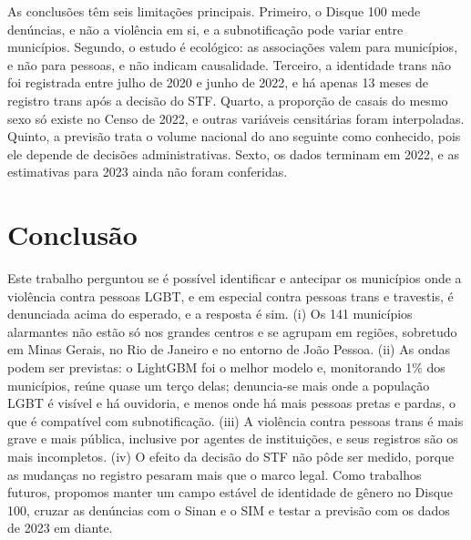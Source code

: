 \documentclass[12pt]{article}
\begin{document}
As conclusões têm seis limitações principais. Primeiro, o Disque 100 mede denúncias, e não a violência em si, e a subnotificação pode variar entre municípios. Segundo, o estudo é ecológico: as associações valem para municípios, e não para pessoas, e não indicam causalidade. Terceiro, a identidade trans não foi registrada entre julho de 2020 e junho de 2022, e há apenas 13 meses de registro trans após a decisão do STF. Quarto, a proporção de casais do mesmo sexo só existe no Censo de 2022, e outras variáveis censitárias foram interpoladas. Quinto, a previsão trata o volume nacional do ano seguinte como conhecido, pois ele depende de decisões administrativas. Sexto, os dados terminam em 2022, e as estimativas para 2023 ainda não foram conferidas.


\clearpage
\section{Conclusão}
\label{sec:conclusao}

Este trabalho perguntou se é possível identificar e antecipar os municípios onde a violência contra pessoas LGBT, e em especial contra pessoas trans e travestis, é denunciada acima do esperado, e a resposta é sim. (i) Os 141 municípios alarmantes não estão só nos grandes centros e se agrupam em regiões, sobretudo em Minas Gerais, no Rio de Janeiro e no entorno de João Pessoa. (ii) As ondas podem ser previstas: o LightGBM foi o melhor modelo e, monitorando 1\% dos municípios, reúne quase um terço delas; denuncia-se mais onde a população LGBT é visível e há ouvidoria, e menos onde há mais pessoas pretas e pardas, o que é compatível com subnotificação. (iii) A violência contra pessoas trans é mais grave e mais pública, inclusive por agentes de instituições, e seus registros são os mais incompletos. (iv) O efeito da decisão do STF não pôde ser medido, porque as mudanças no registro pesaram mais que o marco legal. Como trabalhos futuros, propomos manter um campo estável de identidade de gênero no Disque 100, cruzar as denúncias com o Sinan e o SIM e testar a previsão com os dados de 2023 em diante.


\clearpage


\end{document}

